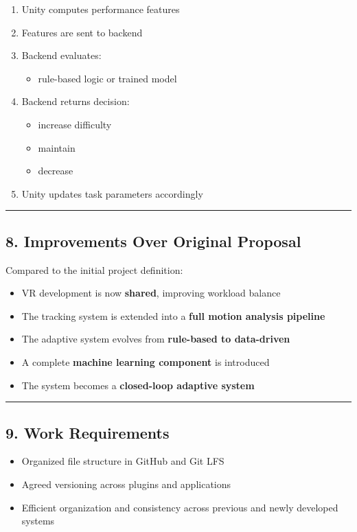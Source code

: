\documentclass[11pt]{article}
\begin{document}
\begin{enumerate}
\item Unity computes performance features
\item Features are sent to backend
\item Backend evaluates:
\begin{itemize}
\item rule-based logic or trained model
\end{itemize}
\item Backend returns decision:
\begin{itemize}
\item increase difficulty
\item maintain
\item decrease
\end{itemize}
\item Unity updates task parameters accordingly
\end{enumerate}

\hrule


\subsection*{8. Improvements Over Original Proposal}


Compared to the initial project definition:


\begin{itemize}
\item VR development is now \textbf{shared}, improving workload balance
\item The tracking system is extended into a \textbf{full motion analysis pipeline}
\item The adaptive system evolves from \textbf{rule-based to data-driven}
\item A complete \textbf{machine learning component} is introduced
\item The system becomes a \textbf{closed-loop adaptive system}
\end{itemize}

\hrule


\subsection*{9. Work Requirements}


\begin{itemize}
\item Organized file structure in GitHub and Git LFS
\item Agreed versioning across plugins and applications
\item Efficient organization and consistency across previous and newly developed systems
\end{itemize}
\end{document}
